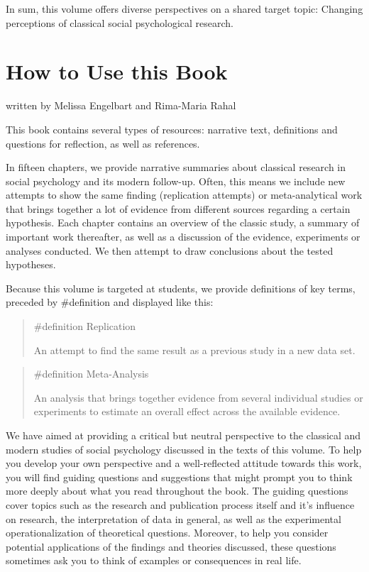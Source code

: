 \documentclass[
  letterpaper,
]{book}
\begin{document}
In sum, this volume offers diverse perspectives on a shared target
topic: Changing perceptions of classical social psychological research.


\chapter*{\texorpdfstring{{How to Use this
Book}}{How to Use this Book}}\label{how-to-use-this-book}


{written by Melissa Engelbart and Rima-Maria Rahal}

This book contains several types of resources: narrative text,
definitions and questions for reflection, as well as references.

In fifteen chapters, we provide narrative summaries about classical
research in social psychology and its modern follow-up. Often, this
means we include new attempts to show the same finding (replication
attempts) or meta-analytical work that brings together a lot of evidence
from different sources regarding a certain hypothesis. Each chapter
contains an overview of the classic study, a summary of important work
thereafter, as well as a discussion of the evidence, experiments or
analyses conducted. We then attempt to draw conclusions about the tested
hypotheses.

Because this volume is targeted at students, we provide definitions of
key terms, preceded by {\#definition} and displayed like this:

\begin{quote}
{\#definition} Replication

An attempt to find the same result as a previous study in a new data
set.
\end{quote}

\begin{quote}
{\#definition} Meta-Analysis

An analysis that brings together evidence from several individual
studies or experiments to estimate an overall effect across the
available evidence.
\end{quote}

We have aimed at providing a critical but neutral perspective to the
classical and modern studies of social psychology discussed in the texts
of this volume. To help you develop your own perspective and a
well-reflected attitude towards this work, you will find guiding
questions and suggestions that might prompt you to think more deeply
about what you read throughout the book. The guiding questions cover
topics such as the research and publication process itself and it's
influence on research, the interpretation of data in general, as well as
the experimental operationalization of theoretical questions. Moreover,
to help you consider potential applications of the findings and theories
discussed, these questions sometimes ask you to think of examples or
consequences in real life.
\end{document}
